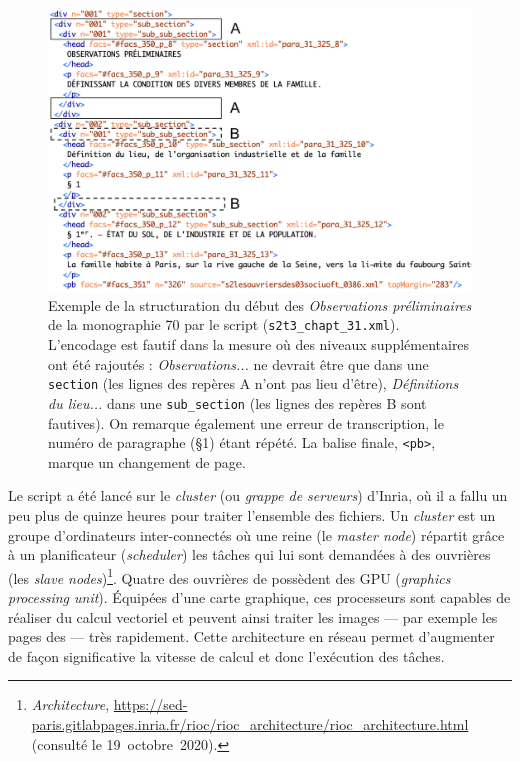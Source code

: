 \begin{figure}[t]
    \centering
    \includegraphics[width=16cm]{img/ex_structure.png}
    \caption[Exemple de la structuration du début de la monographie \no{}70]{Exemple de la structuration du début des \textit{Observations préliminaires} de la monographie \no{}70 par le script \lse{} (\texttt{s2t3\_chapt\_31.xml}). L'encodage est fautif dans la mesure où des niveaux supplémentaires ont été rajoutés : \textit{Observations...} ne devrait être que dans une \texttt{section} (les lignes des repères A n'ont pas lieu d'être), \textit{Définitions du lieu...} dans une \texttt{sub\_section} (les lignes des repères B sont fautives). On remarque également une erreur de transcription, le numéro de paragraphe (§1) étant répété. La balise finale, \texttt{<pb>}, marque un changement de page.}
    \label{fig:ex_structure}
\end{figure}

Le script \lse{} a été lancé sur le \textit{cluster} (ou \textit{grappe de serveurs}) \rioc{} d'Inria, où il a fallu un peu plus de quinze heures pour traiter l'ensemble des fichiers. Un \textit{cluster} est un groupe d'ordinateurs inter-connectés où une \og reine \fg{} (le \textit{master node}) répartit grâce à un \og planificateur \fg{} (\textit{scheduler}) les tâches qui lui sont demandées à des \og ouvrières \fg{} (les \textit{slave nodes})\footnote{\textit{\rioc{} Architecture}, \url{https://sed-paris.gitlabpages.inria.fr/rioc/rioc_architecture/rioc_architecture.html} (consulté le 19~octobre~2020).}. Quatre des \og ouvrières \fg{} de \rioc{} possèdent des GPU (\textit{graphics processing unit}). Équipées d'une carte graphique, ces processeurs sont capables de réaliser du calcul vectoriel et peuvent ainsi traiter les images --- par exemple les pages des \odm{} --- très rapidement. Cette architecture en réseau permet d'augmenter de façon significative la vitesse de calcul et donc l'exécution des tâches.

